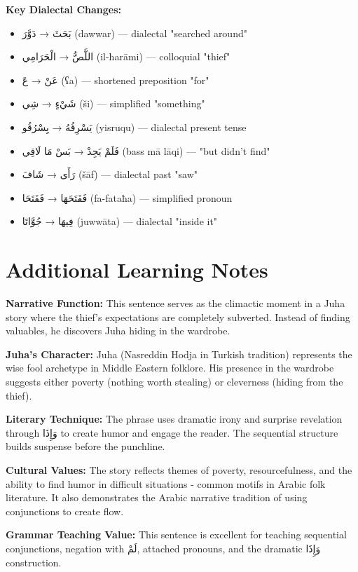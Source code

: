 \documentclass[letterpaper,12pt]{article}
\begin{document}
\textbf{Key Dialectal Changes:}
\begin{itemize}
\item \textarabic{بَحَثَ} → \textarabic{دَوَّرَ} (dawwar) — dialectal "searched around"
\item \textarabic{اللَّصُّ} → \textarabic{الْحَرَامِي} (il-ħarāmi) — colloquial "thief"
\item \textarabic{عَنْ} → \textarabic{عَ} (ʕa) — shortened preposition "for"
\item \textarabic{شَيْءٍ} → \textarabic{شِي} (ši) — simplified "something"
\item \textarabic{يَسْرِقُهُ} → \textarabic{يِسْرُقُو} (yisruqu) — dialectal present tense
\item \textarabic{فَلَمْ يَجِدْ} → \textarabic{بَسْ مَا لَاقِي} (bass mā lāqi) — "but didn't find"
\item \textarabic{رَأَى} → \textarabic{شَافَ} (šāf) — dialectal past "saw"
\item \textarabic{فَفَتَحَهَا} → \textarabic{فَفَتَحَا} (fa-fataħa) — simplified pronoun
\item \textarabic{فِيهَا} → \textarabic{جُوَّاتَا} (juwwāta) — dialectal "inside it"
\end{itemize}

\section{Additional Learning Notes}

\begin{tcolorbox}[colback=boxcolor,colframe=accentcolor,title=\textbf{Cultural and Literary Context},breakable]
\textbf{Narrative Function:} This sentence serves as the climactic moment in a Juha story where the thief's expectations are completely subverted. Instead of finding valuables, he discovers Juha hiding in the wardrobe.

\textbf{Juha's Character:} Juha (Nasreddin Hodja in Turkish tradition) represents the wise fool archetype in Middle Eastern folklore. His presence in the wardrobe suggests either poverty (nothing worth stealing) or cleverness (hiding from the thief).

\textbf{Literary Technique:} The phrase uses dramatic irony and surprise revelation through \textarabic{وَإِذَا} to create humor and engage the reader. The sequential structure builds suspense before the punchline.

\textbf{Cultural Values:} The story reflects themes of poverty, resourcefulness, and the ability to find humor in difficult situations - common motifs in Arabic folk literature. It also demonstrates the Arabic narrative tradition of using conjunctions to create flow.

\textbf{Grammar Teaching Value:} This sentence is excellent for teaching sequential conjunctions, negation with \textarabic{لَمْ}, attached pronouns, and the dramatic \textarabic{وَإِذَا} construction.
\end{tcolorbox}
\end{document}
